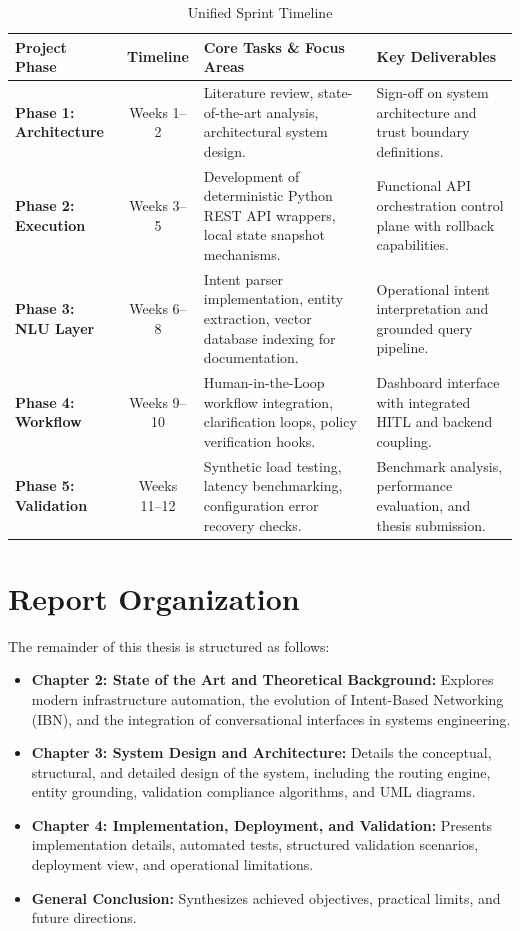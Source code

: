 \begin{table}[htpb]
    \centering
    \caption{Unified Sprint Timeline}
    \label{tab:sprint_planning}
    \renewcommand{\arraystretch}{1.4}
    \small
    \begin{tabular}{|l|c|p{4.8cm}|p{5.2cm}|}
        \hline
        \textbf{Project Phase} & \textbf{Timeline} & \textbf{Core Tasks \& Focus Areas} & \textbf{Key Deliverables} \\
        \hline
        \textbf{Phase 1: Architecture} & Weeks 1--2 & Literature review, state-of-the-art analysis, architectural system design. & Sign-off on system architecture and trust boundary definitions. \\
        \hline
        \textbf{Phase 2: Execution} & Weeks 3--5 & Development of deterministic Python REST API wrappers, local state snapshot mechanisms. & Functional API orchestration control plane with rollback capabilities. \\
        \hline
        \textbf{Phase 3: NLU Layer} & Weeks 6--8 & Intent parser implementation, entity extraction, vector database indexing for documentation. & Operational intent interpretation and grounded query pipeline. \\
        \hline
        \textbf{Phase 4: Workflow} & Weeks 9--10 & Human-in-the-Loop workflow integration, clarification loops, policy verification hooks. & Dashboard interface with integrated HITL and backend coupling. \\
        \hline
        \textbf{Phase 5: Validation} & Weeks 11--12 & Synthetic load testing, latency benchmarking, configuration error recovery checks. & Benchmark analysis, performance evaluation, and thesis submission. \\
        \hline
    \end{tabular}
\end{table}

\section{Report Organization}
The remainder of this thesis is structured as follows:
\begin{itemize}
    \item \textbf{Chapter 2: State of the Art and Theoretical Background:} Explores modern infrastructure automation, the evolution of Intent-Based Networking (IBN), and the integration of conversational interfaces in systems engineering.
    \item \textbf{Chapter 3: System Design and Architecture:} Details the conceptual, structural, and detailed design of the system, including the routing engine, entity grounding, validation compliance algorithms, and UML diagrams.
    \item \textbf{Chapter 4: Implementation, Deployment, and Validation:} Presents implementation details, automated tests, structured validation scenarios, deployment view, and operational limitations.
    \item \textbf{General Conclusion:} Synthesizes achieved objectives, practical limits, and future directions.
\end{itemize}

